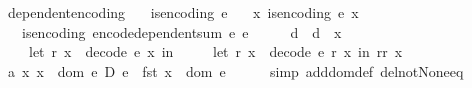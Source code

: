 \begin{isabellebody}
\isanewline
{}\isamarkupfalse%
\ dependent{\isacharunderscore}{\kern0pt}encoding{\isacharcolon}{\kern0pt}\isanewline
\ \ \ {\isachardoublequoteopen}is{\isacharunderscore}{\kern0pt}encoding\ e{}{\isachardoublequoteclose}\isanewline
\ \ \ {\isachardoublequoteopen}{\isasymAnd}x{\isachardot}{\kern0pt}\ is{\isacharunderscore}{\kern0pt}encoding\ {\isacharparenleft}{\kern0pt}e{}\ x{\isacharparenright}{\kern0pt}{\isachardoublequoteclose}\isanewline
\ \ \ {\isachardoublequoteopen}is{\isacharunderscore}{\kern0pt}encoding\ {\isacharparenleft}{\kern0pt}encode{\isacharunderscore}{\kern0pt}dependent{\isacharunderscore}{\kern0pt}sum\ e{}\ e{}{\isacharparenright}{\kern0pt}{\isachardoublequoteclose}\isanewline
%
\isadelimproof
%
\endisadelimproof
%
\isatagproof
{}\isamarkupfalse%
\ {\isacharminus}{\kern0pt}\isanewline
\ \ \isamarkupfalse%
\ d\ \ {\isachardoublequoteopen}d\ {\isacharequal}{\kern0pt}\ {\isacharparenleft}{\kern0pt}{\isasymlambda}x{}{\isachardot}{\kern0pt}\ \isanewline
\ \ \ \ let\ {\isacharparenleft}{\kern0pt}r{}{\isacharcomma}{\kern0pt}\ x{}{\isacharparenright}{\kern0pt}\ {\isacharequal}{\kern0pt}\ decode\ e{}\ x{}\ in\ \isanewline
\ \ \ \ let\ {\isacharparenleft}{\kern0pt}r{}{\isacharcomma}{\kern0pt}\ x{}{\isacharparenright}{\kern0pt}\ {\isacharequal}{\kern0pt}\ decode\ {\isacharparenleft}{\kern0pt}e{}\ r{}{\isacharparenright}{\kern0pt}\ x{}\ in\ {\isacharparenleft}{\kern0pt}{\isacharparenleft}{\kern0pt}r{}{\isacharcomma}{\kern0pt}r{}{\isacharparenright}{\kern0pt}{\isacharcomma}{\kern0pt}\ x{}{\isacharparenright}{\kern0pt}{\isacharparenright}{\kern0pt}{\isachardoublequoteclose}\isanewline
\isanewline
\ \ \isamarkupfalse%
\ a{\isacharcolon}{\kern0pt}\ {\isachardoublequoteopen}{\isasymAnd}x{\isachardot}{\kern0pt}\ x\ {\isasymin}\ dom\ {\isacharparenleft}{\kern0pt}e{}\ {\isasymtimes}\isactrlsub D\ e{}{\isacharparenright}{\kern0pt}\ {\isasymLongrightarrow}\ fst\ x\ {\isasymin}\ dom\ e{}{\isachardoublequoteclose}\isanewline
\ \ \ \ \isamarkupfalse%
\ {\isacharparenleft}{\kern0pt}simp\ add{\isacharcolon}{\kern0pt}dom{\isacharunderscore}{\kern0pt}def\ del{\isacharcolon}{\kern0pt}not{\isacharunderscore}{\kern0pt}None{\isacharunderscore}{\kern0pt}eq{\isacharparenright}{\kern0pt}\ \isanewline

\end{isabellebody}
